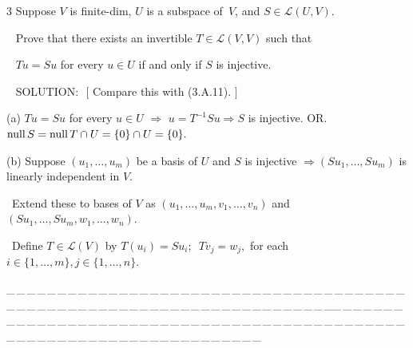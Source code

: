 \documentclass[a4paper, 11pt, UTF8]{article}
\def\null{\textup{null\,}}
\def\Lm{\mathcal{L}}
\begin{document}
\begin{large}
{\timesbf\Large 3} {\timessl\Large 
Suppose $V$ is finite-dim, $U$ is a subspace of \,$V$, and $S\in\Lm(U, V)$.}\par\,\,\,
{\timessl\Large Prove that there exists an invertible $T\in\Lm(V,V)$ such that}\par\,\,\,
{\timessl\Large $Tu = Su$ for every $u\in U$ if and only if $S$ is injective.}\par\,\,\,
{\timesbf S\footnotesize{OLUTION:}}\,\,\,\,{\timessl $[$ Compare this with (3.A.11). $]$}\par\quad
(a) $Tu = Su$ for every $u\in U$ $\Rightarrow$ $u=T^{-1}Su\Rightarrow S$ is injective. O{\small R.} $\null S=\null T\cap U=\{0\}\cap U=\{0\}.$\par\quad
(b) Suppose $(u_1,\dots,u_m)$ be a basis of $U$ and $S$ is injective $\Rightarrow(Su_1,\dots,Su_m)$ is linearly independent in $V$.\par\qquad\,
Extend these to bases of $V$ as $(u_1,\dots,u_m,v_1,\dots,v_n)$ and $(Su_1,\dots,Su_m,w_1,\dots,w_n)$.\par\qquad\,
Define $T\in\Lm(V)$ by $T(u_i)=Su_i;\,\,\,Tv_j=w_j,$ for each $i\in\{1,\dots,m\},j\in\{1,\dots,n\}$.\par
{\tiny \_\,\_\,\_\,\_\,\_\,\_\,\_\,\_\,\_\,\_\,\_\,\_\,\_\,\_\,\_\,\_\,\_\,\_\,\_\,\_\,\_\,\_\,\_\,\_\,\_\,\_\,\_\,\_\,\_\,\_\,\_\,\_\,\_\,\_\,\_\,\_\,\_\,\_\,\_\,\_\,\_\,\_\,\_\,\_\,\_\,\_\,\_\,\_\,\_\,\_\,\_\,\_\,\_\,\_\,\_\,\_\,\_\,\_\,\_\,\_\,\_\,\_\,\_\,\_\,\_\,\_\,\_\,\_\,\_\,\_\,\_\_\,\_\,\_\,\_\,\_\,\_\,\_\,\_\,\_\,\_\,\_\,\_\,\_\,\_\,\_\,\_\,\_\,\_\,\_\,\_\,\_\,\_\,\_\,\_\,\_\,\_\,\_\,\_\,\_\,\_\,\_\,\_\,\_\,\_\,\_\,\_\,\_\,\_\,\_\,\_\,\_\,\_\,\_\,\_\,\_\,\_\,\_\,\_\,\_\,\_\,\_\,\_\,\_\,\_\,\_\,\_\,\_\,\_\,\_\,\_\,\_\,\_\,\_\,\_\,\_\,\_\,\_\,\_\,\_\,\_\,\_}\par


\end{large}
\end{document}

